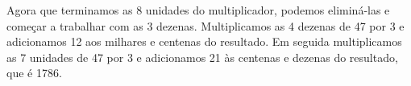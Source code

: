 \documentclass[12pt]{book}
\begin{document}
\vspace{0.25cm}
\begin{minipage}{0.4\textwidth}
\end{minipage}%
%
\begin{minipage}{0.3\textwidth}
\end{minipage}%
%
\begin{minipage}{0.3\textwidth}
\end{minipage}

\vspace{0.25cm}
Agora que terminamos as 8 unidades do
multiplicador, podemos eliminá-las e
começar a trabalhar com as 3 dezenas.
Multiplicamos as 4 dezenas de 47 por
3 e adicionamos 12 aos milhares e centenas
do resultado. Em seguida multiplicamos
as 7 unidades de 47 por 3 e adicionamos 21
às centenas e dezenas do resultado,
que é 1786.
\end{document}
